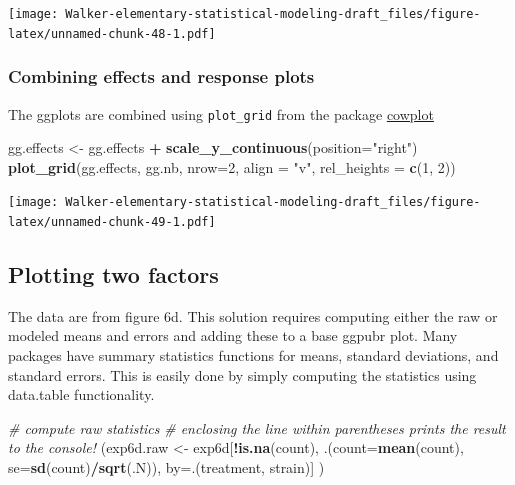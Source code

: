\documentclass[]{book}
\newenvironment{Shaded}{\begin{snugshade}}{\end{snugshade}}
\newcommand{\CommentTok}[1]{\textcolor[rgb]{0.56,0.35,0.01}{\textit{#1}}}
\newcommand{\DataTypeTok}[1]{\textcolor[rgb]{0.13,0.29,0.53}{#1}}
\newcommand{\DecValTok}[1]{\textcolor[rgb]{0.00,0.00,0.81}{#1}}
\newcommand{\KeywordTok}[1]{\textcolor[rgb]{0.13,0.29,0.53}{\textbf{#1}}}
\newcommand{\NormalTok}[1]{#1}
\newcommand{\OperatorTok}[1]{\textcolor[rgb]{0.81,0.36,0.00}{\textbf{#1}}}
\newcommand{\StringTok}[1]{\textcolor[rgb]{0.31,0.60,0.02}{#1}}
\begin{document}
\texttt{[image: Walker-elementary-statistical-modeling-draft\_files/figure-latex/unnamed-chunk-48-1.pdf]}

\hypertarget{combining-effects-and-response-plots}{%
\subsubsection{Combining effects and response plots}\label{combining-effects-and-response-plots}}

The ggplots are combined using \texttt{plot\_grid} from the package \href{https://cran.r-project.org/web/packages/cowplot/vignettes/introduction.html}{cowplot}

\begin{Shaded}
\begin{Highlighting}[]
\NormalTok{gg.effects <-}\StringTok{ }\NormalTok{gg.effects }\OperatorTok{+}\StringTok{ }\KeywordTok{scale_y_continuous}\NormalTok{(}\DataTypeTok{position=}\StringTok{"right"}\NormalTok{)}
\KeywordTok{plot_grid}\NormalTok{(gg.effects, gg.nb, }\DataTypeTok{nrow=}\DecValTok{2}\NormalTok{, }\DataTypeTok{align =} \StringTok{"v"}\NormalTok{, }\DataTypeTok{rel_heights =} \KeywordTok{c}\NormalTok{(}\DecValTok{1}\NormalTok{, }\DecValTok{2}\NormalTok{))}
\end{Highlighting}
\end{Shaded}

\texttt{[image: Walker-elementary-statistical-modeling-draft\_files/figure-latex/unnamed-chunk-49-1.pdf]}

\hypertarget{plotting-two-factors}{%
\subsection{Plotting two factors}\label{plotting-two-factors}}

The data are from figure 6d. This solution requires computing either the raw or modeled means and errors and adding these to a base ggpubr plot. Many packages have summary statistics functions for means, standard deviations, and standard errors. This is easily done by simply computing the statistics using data.table functionality.

\begin{Shaded}
\begin{Highlighting}[]
\CommentTok{# compute raw statistics}
\CommentTok{# enclosing the line within parentheses prints the result to the console!}
\NormalTok{(exp6d.raw <-}\StringTok{ }\NormalTok{exp6d[}\OperatorTok{!}\KeywordTok{is.na}\NormalTok{(count), .(}\DataTypeTok{count=}\KeywordTok{mean}\NormalTok{(count),}
                       \DataTypeTok{se=}\KeywordTok{sd}\NormalTok{(count)}\OperatorTok{/}\KeywordTok{sqrt}\NormalTok{(.N)),}
                   \DataTypeTok{by=}\NormalTok{.(treatment, strain)]}
\NormalTok{)}
\end{Highlighting}
\end{Shaded}
\end{document}
